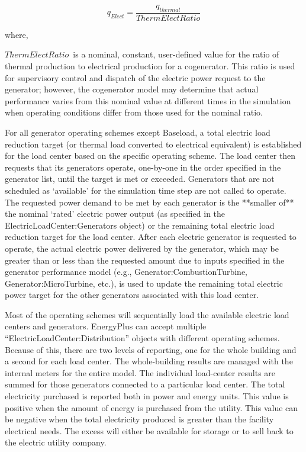 \begin{equation}
{q_{Elect}} = \frac{{{q_{thermal}}}}{{ThermElectRatio}}
\end{equation}

where,

$ThermElectRatio$\ is a nominal, constant, user-defined value for the ratio of thermal production to electrical production for a cogenerator. This ratio is used for supervisory control and dispatch of the electric power request to the generator; however, the cogenerator model may determine that actual performance varies from this nominal value at different times in the simulation when operating conditions differ from those used for the nominal ratio.

For all generator operating schemes except Baseload, a total electric load reduction target (or thermal load converted to electrical equivalent) is established for the load center based on the specific operating scheme. The load center then requests that its generators operate, one-by-one in the order specified in the generator list, until the target is met or exceeded. Generators that are not scheduled as ‘available’ for the simulation time step are not called to operate. The requested power demand to be met by each generator is the **smaller of** the nominal ‘rated’ electric power output (as specified in the ElectricLoadCenter:Generators object) or the remaining total electric load reduction target for the load center. After each electric generator is requested to operate, the actual electric power delivered by the generator, which may be greater than or less than the requested amount due to inputs specified in the generator performance model (e.g., Generator:CombustionTurbine, Generator:MicroTurbine, etc.), is used to update the remaining total electric power target for the other generators associated with this load center.

Most of the operating schemes will sequentially load the available electric load centers and generators. EnergyPlus can accept multiple “ElectricLoadCenter:Distribution” objects with different operating schemes. Because of this, there are two levels of reporting, one for the whole building and a second for each load center. The whole-building results are managed with the internal meters for the entire model. The individual load-center results are summed for those generators connected to a particular load center. The total electricity purchased is reported both in power and energy units. This value is positive when the amount of energy is purchased from the utility. This value can be negative when the total electricity produced is greater than the facility electrical needs. The excess will either be available for storage or to sell back to the electric utility company.

